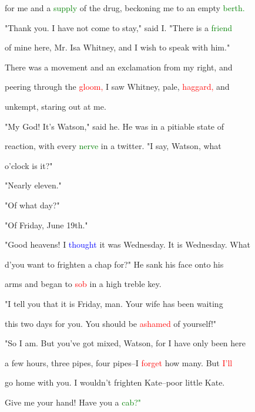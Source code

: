  for me and a \textcolor{green}{supply} of the drug, beckoning me to an empty \textcolor{green}{berth.}



 "Thank you. I have not come to stay," said I. "There is a \textcolor{green}{friend}

 of mine here, Mr. Isa Whitney, and I wish to speak with him."



 There was a movement and an exclamation from my right, and

 peering through the \textcolor{red}{gloom,} I saw Whitney, pale, \textcolor{red}{haggard,} and

 unkempt, \textcolor{BurntOrange}{staring} out at me.



 "My \textcolor{BurntOrange}{God!} It's Watson," said he. He was in a pitiable state of

 reaction, with every \textcolor{green}{nerve} in a twitter. "I say, Watson, what

 o'clock is it?"



 "Nearly eleven."



 "Of what day?"



 "Of Friday, June 19th."



 \textcolor{BurntOrange}{"Good} heavens! I \textcolor{blue}{thought} it was Wednesday. It is Wednesday. What

 d'you want to \textcolor{BurntOrange}{frighten} a chap for?" He sank his face onto his

 arms and began to \textcolor{red}{sob} in a high treble key.



 "I tell you that it is Friday, man. Your wife has been \textcolor{BurntOrange}{waiting}

 this two days for you. You should be \textcolor{red}{ashamed} of yourself!"



 "So I am. But you've got mixed, Watson, for I have only been here

 a few hours, three pipes, four pipes--I \textcolor{red}{forget} how many. But \textcolor{red}{I'll}

 go home with you. I wouldn't \textcolor{BurntOrange}{frighten} Kate--poor little Kate.

 Give me your hand! Have you a \textcolor{green}{cab?"}



